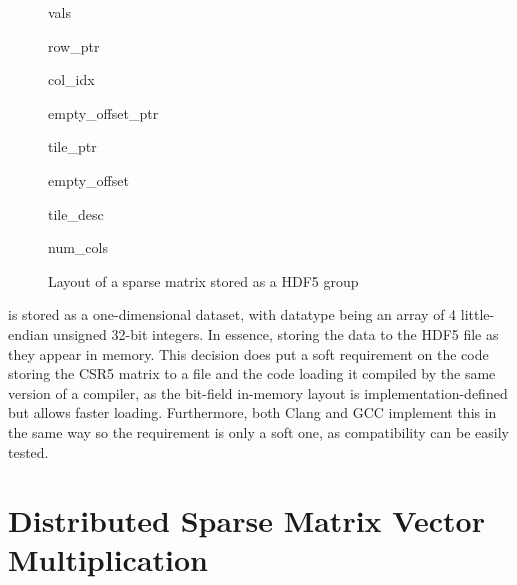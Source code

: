 \documentclass[thesis=M,english]{FITthesis}[2019/12/23]
\begin{document}
\begin{figure}[!h]
    \begin{tcolorbox}[title=/A, colback=gray!30!white]
        \begin{infobox}[colback=hdtsc]
            vals
        \end{infobox}
        \begin{infobox}[colback=hdtsc]
            row\_ptr
        \end{infobox}
        \begin{infobox}[colback=hdtsc]
            col\_idx
        \end{infobox}
        \begin{infobox}[colback=hdtsc, width=0.3\textwidth]
            empty\_offset\_ptr
        \end{infobox}
        \begin{infobox}[colback=hdtsc]
            tile\_ptr
        \end{infobox}
        \begin{infobox}[colback=hdtsc]
            empty\_offset
        \end{infobox}
        \begin{infobox}[colback=hdtsc]
            tile\_desc
        \end{infobox}
        \begin{infobox}[colback=hdatc, width=0.2\textwidth]
            num\_cols
        \end{infobox}
    \end{tcolorbox}
    \caption{Layout of a sparse matrix stored as a HDF5 group}
\end{figure}

 is stored as a one-dimensional dataset, with datatype being
an array of 4 little-endian unsigned 32-bit integers. In essence, storing the data to the HDF5 file as
they appear in memory. This decision does put a soft requirement on the code storing the CSR5 matrix to a file
and the code loading it compiled by the same version of a compiler, as
the bit-field in-memory layout is implementation-defined but allows faster loading. Furthermore, both
Clang and GCC implement this in the same way so the requirement is only a soft one, as compatibility can
be easily tested.



\chapter{Distributed Sparse Matrix Vector Multiplication}
\end{document}
